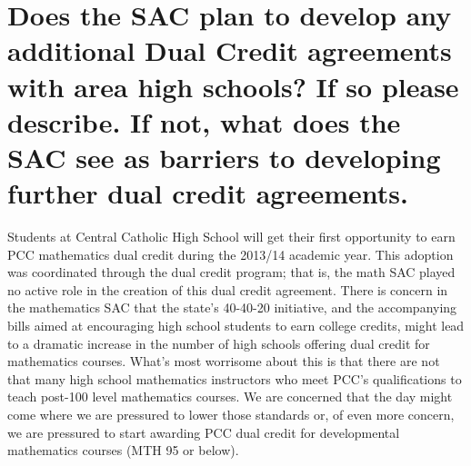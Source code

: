\section[Future dual credit relationships]{Does the SAC plan to develop any additional Dual Credit agreements with area high schools?  If so please describe.   If not, what does the SAC see as barriers to developing further dual credit agreements. }
Students at Central Catholic High School will get their first opportunity to earn PCC mathematics dual credit during the 2013/14 academic year.  This adoption was coordinated through the dual credit program; that is, the math SAC played no active role in the creation of this dual credit agreement.
There is concern in the mathematics SAC that the state's 40-40-20 initiative, and the accompanying bills aimed at encouraging high school students to earn college credits, might lead to a dramatic increase in the number of high schools offering dual credit for mathematics courses.  What's most worrisome about this is that there are not that many high school mathematics instructors who meet PCC's qualifications to teach post-100 level mathematics courses.  We are concerned that the day might come where we are pressured to lower those standards or, of even more concern, we are pressured to start awarding PCC dual credit for developmental mathematics courses (MTH 95 or below).

